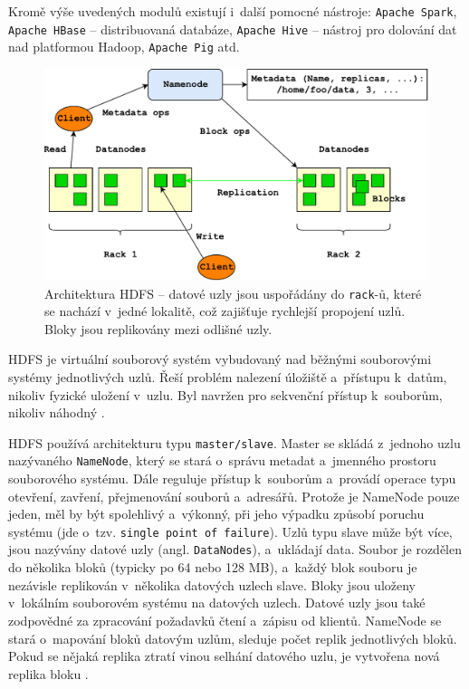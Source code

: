 \noindent Kromě výše uvedených modulů existují i~další pomocné nástroje:  \texttt{Apache Spark}, \texttt{Apache HBase} -- distribuovaná databáze, \texttt{Apache Hive} -- nástroj pro dolování dat nad platformou Hadoop, \texttt{Apache Pig} atd.

\begin{figure}[!h]
  \centering
  \includegraphics[width=15cm]{template-fig/HDFSArchitecture.pdf}
  \caption{Architektura HDFS \cite{apacheHDFSGuide} -- datové uzly jsou uspořádány do \texttt{rack}-ů, které se nachází v~jedné lokalitě, což zajišťuje rychlejší propojení uzlů. Bloky jsou replikovány mezi odlišné uzly.}
  \label{FIG_HDFSArchitecture}
\end{figure}

\noindent HDFS je virtuální souborový systém vybudovaný nad běžnými souborovými systémy jednotlivých uzlů. Řeší problém nalezení úložiště a~přístupu k~datům, nikoliv fyzické uložení v~uzlu. Byl navržen pro sekvenční přístup k~souborům, nikoliv náhodný \cite{hadoopPdi}.

\noindent HDFS používá architekturu typu \texttt{master/slave}. Master se skládá z~jednoho uzlu nazývaného \texttt{NameNode}, který se stará o~správu metadat a~jmenného prostoru souborového systému. Dále reguluje přístup k~souborům a~provádí operace typu otevření, zavření, přejmenování souborů a~adresářů. Protože je NameNode pouze jeden, měl by být spolehlivý a~výkonný, při jeho výpadku způsobí poruchu systému (jde o~tzv. \texttt{single point of failure}). Uzlů typu slave může být více, jsou nazývány datové uzly (angl. \texttt{DataNodes}), a~ukládají data. Soubor je rozdělen do několika bloků (typicky po 64 nebo 128 MB), a~každý blok souboru je nezávisle replikován v~několika datových uzlech slave. Bloky jsou uloženy v~lokálním souborovém systému na datových uzlech. Datové uzly jsou také zodpovědné za zpracování požadavků čtení a~zápisu od klientů. NameNode se stará o~mapování bloků datovým uzlům, sleduje počet replik jednotlivých bloků. Pokud se nějaká replika ztratí vinou selhání datového uzlu, je vytvořena nová replika bloku \cite{hadoopHortonworks}.

